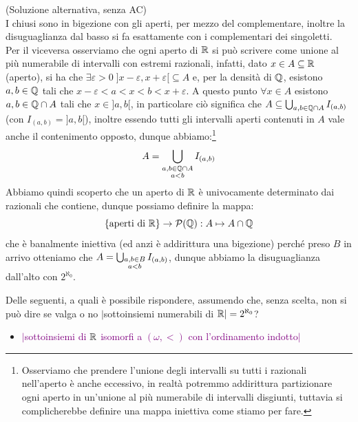 \begin{soln}
	(Soluzione alternativa, senza AC)\\
	I chiusi sono in bigezione con gli aperti, per mezzo del complementare, inoltre la disuguaglianza dal basso si fa esattamente con i complementari dei singoletti.\\ Per il viceversa osserviamo che ogni aperto di $\mathbb R$ si pu\`o scrivere come unione al pi\`u numerabile di intervalli con estremi razionali,
	infatti, dato $x \in A \subseteq \mathbb R$ (aperto), si ha che $\exists\varepsilon > 0 \; ]x - \varepsilon, x + \varepsilon[ \subseteq A$ e, per la densit\`a di $\mathbb Q$, esistono $a,b \in \mathbb Q$ tali che $x - \varepsilon < a < x < b < x + \varepsilon$.
	A questo punto $\forall x \in A$ esistono $a,b \in \mathbb Q \cap A$ tali che $x \in ]a,b[$, in particolare ci\`o significa che $A \subseteq \bigcup_{a,b \in \mathbb Q \cap A} I_{(a,b)}$ (con $I_{(a,b)} = ]a,b[$), inoltre essendo tutti gli intervalli aperti contenuti in $A$ vale anche il contenimento opposto, dunque abbiamo:\footnote{Osserviamo che prendere l'unione degli intervalli su tutti i razionali nell'aperto \`e anche eccessivo, in realt\`a potremmo addirittura partizionare ogni aperto in un'unione al pi\`u numerabile di intervalli disgiunti, tuttavia si complicherebbe definire una mappa iniettiva come stiamo per fare.}
	\[ A = \bigcup_{\begin{subarray}{c}a,b \in \mathbb Q \cap A\\ a < b\end{subarray}} I_{(a,b)}
		\]
	Abbiamo quindi scoperto che un aperto di $\mathbb R$ \`e univocamente determinato dai razionali che contiene, dunque possiamo definire la mappa:
	\[ \{\text{aperti di $\mathbb R$}\} \to \mathcal{P}(\mathbb Q) : A \mapsto A \cap \mathbb Q 
		\]
	che \`e banalmente iniettiva (ed anzi \`e addirittura una bigezione) perch\'e preso $B$ in arrivo otteniamo che $A = \bigcup_{\begin{subarray}{c}a,b \in B\\ a < b\end{subarray}} I_{(a,b)}$, dunque abbiamo la disuguaglianza dall'alto con $2^{\aleph_0}$.
\end{soln}

\pagebreak
\begin{exercise}
	Delle seguenti, a quali \`e possibile rispondere, assumendo che, senza scelta, non si pu\`o dire se valga o no $|$sottoinsiemi numerabili di $\mathbb R| =2^{\aleph_0}$?
\end{exercise}

\begin{itemize}
	\item \textcolor{purple}{$|$sottoinsiemi di $\mathbb R$ isomorfi a $(\omega,<)$ con l'ordinamento indotto$|$}
\end{itemize}

